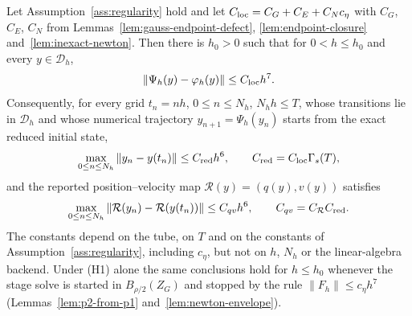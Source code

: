\begin{theorem}
\label{thm:g6fullva-order}
Let Assumption~\ref{ass:regularity} hold and let $C_{\rm loc}=C_G+C_E+C_Nc_\eta$ with $C_G$, $C_E$,
$C_N$ from Lemmas~\ref{lem:gauss-endpoint-defect}, \ref{lem:endpoint-closure}
and~\ref{lem:inexact-newton}. Then there is $h_0>0$ such that for $0<h\le h_0$ and every
$y\in\mathcal D_h$,
\begin{equation}
\label{eq:g6fva-local-defect-theorem}
  \|\Psi_h(y)-\varphi_h(y)\|\le C_{\rm loc}h^7 .
\end{equation}
Consequently, for every grid $t_n=nh$, $0\le n\le N_h$, $N_hh\le T$, whose transitions lie in
$\mathcal D_h$ and whose numerical trajectory $y_{n+1}=\Psi_h(y_n)$ starts from the exact reduced
initial state,
\begin{equation}
\label{eq:g6fva-reduced-grid-bound}
  \max_{0\le n\le N_h}\|y_n-y(t_n)\|\le C_{\rm red}h^6,\qquad C_{\rm red}=C_{\rm loc}\Gamma_s(T),
\end{equation}
and the reported position--velocity map $\mathcal R(y)=(q(y),v(y))$ satisfies
\begin{equation}
\label{eq:g6fva-reported-grid-bound}
  \max_{0\le n\le N_h}\|\mathcal R(y_n)-\mathcal R(y(t_n))\|\le C_{qv}h^6,\qquad
  C_{qv}=C_{\mathcal R}C_{\rm red} .
\end{equation}
The constants depend on the tube, on $T$ and on the constants of Assumption~\ref{ass:regularity},
including $c_\eta$, but not on $h$, $N_h$ or the linear-algebra backend. Under (H1) alone the same
conclusions hold for $h\le h_0$ whenever the stage solve is started in $B_{\rho/2}(Z_G)$ and
stopped by the rule $\|F_h\|\le c_\eta h^7$ (Lemmas~\ref{lem:p2-from-p1}
and~\ref{lem:newton-envelope}).
\end{theorem}

